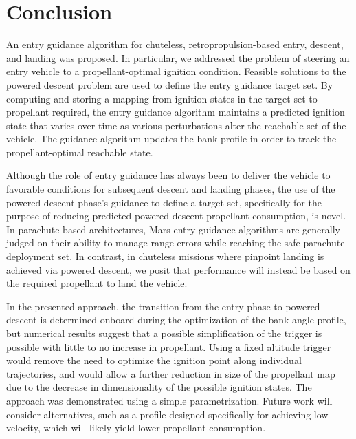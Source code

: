 \documentclass[letterpaper, paper,11pt]{AAS}
\begin{document}
 
\section{Conclusion}
An entry guidance algorithm for chuteless, retropropulsion-based entry, descent, and landing was proposed. In particular, we addressed the problem of steering an entry vehicle to a propellant-optimal ignition condition. Feasible solutions to the powered descent problem are used to define the entry guidance target set. By computing and storing a mapping from ignition states in the target set to propellant required, the entry guidance algorithm maintains a predicted ignition state that varies over time as various perturbations alter the reachable set of the vehicle. The guidance algorithm updates the bank profile in order to track the propellant-optimal reachable state.

Although the role of entry guidance has always been to deliver the vehicle to favorable conditions for subsequent descent and landing phases, the use of the powered descent phase's guidance to define a target set, specifically for the purpose of reducing predicted powered descent propellant consumption, is novel. In parachute-based architectures, Mars entry guidance algorithms are generally judged on their ability to manage range errors while reaching the safe parachute deployment set. In contrast, in chuteless missions where pinpoint landing is achieved via powered descent, we posit that performance will instead be based on the required propellant to land the vehicle.

In the presented approach, the transition from the entry phase to powered descent is determined onboard during the optimization of the bank angle profile, but numerical results suggest that a possible simplification of the trigger is possible with little to no increase in propellant. Using a fixed altitude trigger would remove the need to optimize the ignition point along individual trajectories, and would allow a further reduction in size of the propellant map due to the decrease in dimensionality of the possible ignition states. The approach was demonstrated using a simple parametrization. Future work will consider alternatives, such as a profile designed specifically for achieving low velocity, which will likely yield lower propellant consumption. 


\end{document}
